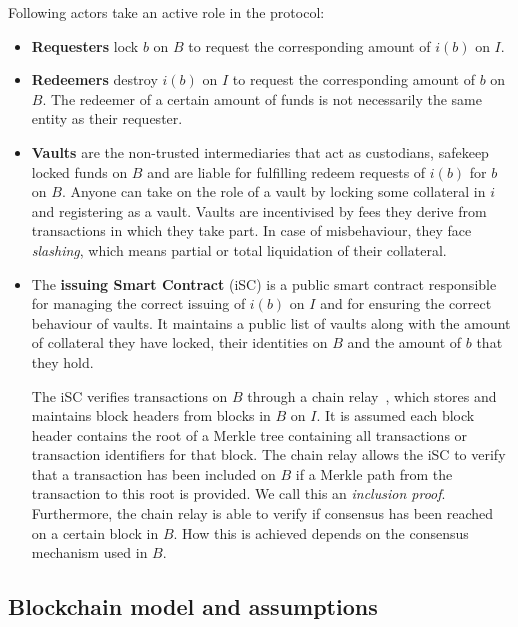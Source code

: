 Following actors take an active role in the protocol:
\begin{itemize}
    \item \textbf{Requesters} lock $b$ on $B$ to request the corresponding amount of $i(b)$ on $I$.
    \item \textbf{Redeemers} destroy $i(b)$ on $I$ to request the corresponding amount of $b$ on $B$.
    The redeemer of a certain amount of funds is not necessarily the same entity as their requester.
    \item \textbf{Vaults} are the non-trusted intermediaries that act as custodians, safekeep locked funds on $B$ and are liable for fulfilling redeem requests of $i(b)$ for $b$ on $B$.
    Anyone can take on the role of a vault by locking some collateral in $i$ and registering as a vault.
    Vaults are incentivised by fees they derive from transactions in which they take part.
    In case of misbehaviour, they face \emph{slashing}, which means partial or total liquidation of their collateral.
    \item The \textbf{issuing Smart Contract} (\textsf{iSC}) is a public smart contract responsible for managing the correct issuing of $i(b)$ on $I$ and for ensuring the correct behaviour of vaults.
    It maintains a public list of vaults along with the amount of collateral they have locked, their identities on $B$ and the amount of $b$ that they hold.
    
    The \textsf{iSC} verifies transactions on $B$ through a chain relay~\cite{Back2014sidechains,buterin2016interop}, which stores and maintains block headers from blocks in $B$ on $I$.
    It is assumed each block header contains the root of a Merkle tree containing all transactions or transaction identifiers for that block.
    The chain relay allows the \textsf{iSC} to verify that a transaction has been included on $B$ if a Merkle path from the transaction to this root is provided.
    We call this an \emph{inclusion proof}.
    Furthermore, the chain relay is able to verify if consensus has been reached on a certain block in $B$.
    How this is achieved depends on the consensus mechanism used in $B$.
\end{itemize}

\subsection{Blockchain model and assumptions}
\label{sec:blockchain_model}


